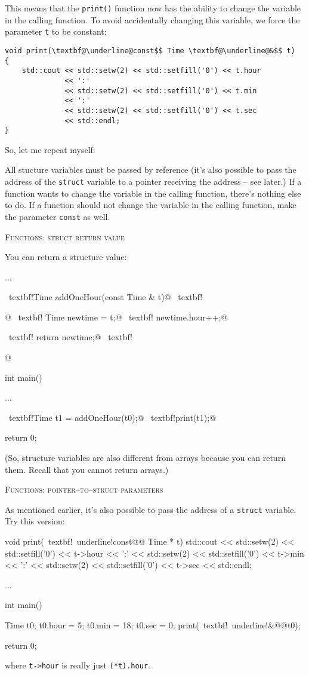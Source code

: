 This means that the \verb!print()! function now has the ability to change the
variable in the calling function. To avoid accidentally changing this variable,
we force the parameter \verb!t! to be constant:
\begin{Verbatim}[frame=single, commandchars=\\\@\$]
void print(\textbf@\underline@const$$ Time \textbf@\underline@&$$ t)
{
    std::cout << std::setw(2) << std::setfill('0') << t.hour
              << ':'
              << std::setw(2) << std::setfill('0') << t.min
              << ':'
              << std::setw(2) << std::setfill('0') << t.sec
              << std::endl;
}
\end{Verbatim}

So, let me repeat myself:

All stucture variables must be passed by reference (it's also possible to pass
the address of the \verb!struct! variable to a pointer receiving the address --
see later.) If a function wants to change the variable in the calling function,
there's nothing else to do. If a function should not change the variable in the
calling function, make the parameter \verb!const! as well.




\textsc{Functions: struct return value}

You can return a structure value:
\begin{console}[commandchars=~!@]
...

~textbf!Time addOneHour(const Time & t)@
~textbf!{@
~textbf!    Time newtime = t;@
~textbf!    newtime.hour++;@

~textbf!    return newtime;@
~textbf!}@

int main()
{
    ...

    ~textbf!Time t1 = addOneHour(t0);@
    ~textbf!print(t1);@

    return 0;
}
\end{console}

(So, structure variables are also different from arrays because you can return
them. Recall that you cannot return arrays.)




\textsc{Functions: pointer--to--struct parameters}

As mentioned earlier, it's also possible to pass the address of a
\verb!struct! variable. Try this version:
\begin{console}[commandchars=~!@]
void print(~textbf!~underline!const@@ Time * t)
{
    std::cout << std::setw(2) << std::setfill('0') << t->hour 
              << ':'
              << std::setw(2) << std::setfill('0') << t->min 
              << ':'
              << std::setw(2) << std::setfill('0') << t->sec
              << std::endl;
}

... 

int main()
{
    Time t0;
    t0.hour = 5;
    t0.min = 18;
    t0.sec = 0;
    print(~textbf!~underline!&@@t0);

    return 0;
}
\end{console}
where \verb!t->hour! is really just \verb!(*t).hour!.

